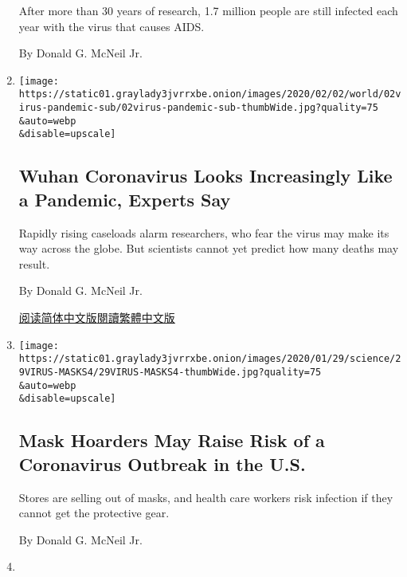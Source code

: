 \begin{enumerate}
  After more than 30 years of research, 1.7 million people are still
  infected each year with the virus that causes AIDS.

  By Donald G. McNeil Jr.
\item
  \href{/2020/02/02/health/coronavirus-pandemic-china.html}{}

  \texttt{[image: https://static01.graylady3jvrrxbe.onion/images/2020/02/02/world/02virus-pandemic-sub/02virus-pandemic-sub-thumbWide.jpg?quality=75\\\&auto=webp\\\&disable=upscale]}

  \hypertarget{wuhan-coronavirus-looks-increasingly-like-a-pandemic-experts-say}{%
  \subsection{Wuhan Coronavirus Looks Increasingly Like a Pandemic,
  Experts
  Say}\label{wuhan-coronavirus-looks-increasingly-like-a-pandemic-experts-say}}

  Rapidly rising caseloads alarm researchers, who fear the virus may
  make its way across the globe. But scientists cannot yet predict how
  many deaths may result.

  By Donald G. McNeil Jr.

  \href{https://cn.nytimes3xbfgragh.onion/china/20200203/coronavirus-pandemic-china/}{阅读简体中文版}\href{https://cn.nytimes3xbfgragh.onion/china/20200203/coronavirus-pandemic-china/zh-hant/}{閱讀繁體中文版}
\item
  \href{/2020/01/29/health/coronavirus-masks-hoarding.html}{}

  \texttt{[image: https://static01.graylady3jvrrxbe.onion/images/2020/01/29/science/29VIRUS-MASKS4/29VIRUS-MASKS4-thumbWide.jpg?quality=75\\\&auto=webp\\\&disable=upscale]}

  \hypertarget{mask-hoarders-may-raise-risk-of-a-coronavirus-outbreak-in-the-us}{%
  \subsection{Mask Hoarders May Raise Risk of a Coronavirus Outbreak in
  the
  U.S.}\label{mask-hoarders-may-raise-risk-of-a-coronavirus-outbreak-in-the-us}}

  Stores are selling out of masks, and health care workers risk
  infection if they cannot get the protective gear.

  By Donald G. McNeil Jr.
\item
  \href{/2020/01/15/health/surgeons-checklists.html}{}


\end{enumerate}
